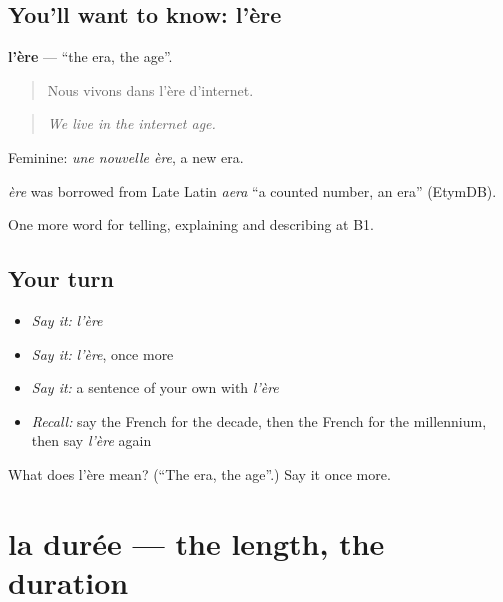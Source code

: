 \subsection*{You'll want to know: l'ère}
\textbf{l'ère} — \textquotedblleft{}the era, the age\textquotedblright{}.

\begin{quote}
Nous vivons dans l'ère d'internet.
\end{quote}

\begin{quote}
\emph{We live in the internet age.}
\end{quote}

Feminine: \emph{une nouvelle ère}, a new era.

\begin{cousinweb}
\emph{ère} was borrowed from Late Latin \emph{aera} \textquotedblleft{}a counted number, an era\textquotedblright{} (EtymDB).
\end{cousinweb}

\begin{grammarlens}[title={What you've built}]
One more word for telling, explaining and describing at B1.
\end{grammarlens}

\subsection*{Your turn}
\begin{itemize}
\raggedright
  \item \emph{Say it:} \emph{l'ère}
  \item \emph{Say it:} \emph{l'ère}, once more
  \item \emph{Say it:} a sentence of your own with \emph{l'ère}
  \item \emph{Recall:} say the French for the decade, then the French for the millennium, then say \emph{l'ère} again
\end{itemize}

\begin{tcolorbox}[breakable,colback=teal!4,colframe=teal!35!black,title={Before you move on}]
What does l'ère mean? (\textquotedblleft{}The era, the age\textquotedblright{}.) Say it once more.
\end{tcolorbox}
\section[la durée]{la durée — the length, the duration}

